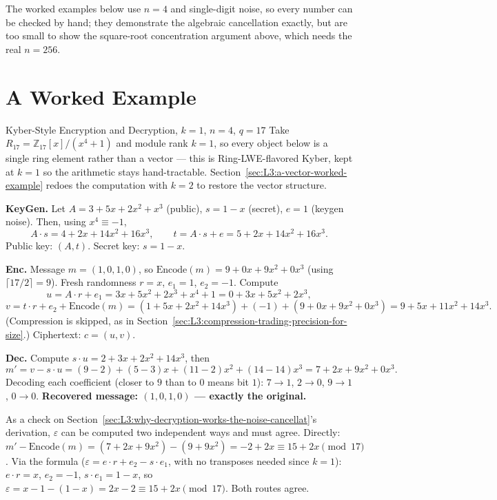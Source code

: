 The worked examples below use $n=4$ and single-digit noise, so every number can be checked by hand; they demonstrate the algebraic cancellation exactly, but are too small to show the square-root concentration argument above, which needs the real $n=256$.

\section{A Worked Example}
\label{sec:L3:a-fully-worked-example-by-hand}

\begin{exbox}{Kyber-Style Encryption and Decryption, $k=1$, $n=4$, $q=17$}
Take $R_{17}=\mathbb{Z}_{17}[x]/(x^4+1)$ and module rank $k=1$, so every object below is a single ring element rather than a vector --- this is Ring-LWE-flavored Kyber, kept at $k=1$ so the arithmetic stays hand-tractable. Section~\ref{sec:L3:a-vector-worked-example} redoes the computation with $k=2$ to restore the vector structure.

\textbf{KeyGen.} Let $A=3+5x+2x^2+x^3$ (public), $s=1-x$ (secret), $e=1$ (keygen noise). Then, using $x^4\equiv-1$,
$$
A\cdot s = 4+2x+14x^2+16x^3, \qquad t = A\cdot s+e = 5+2x+14x^2+16x^3.
$$
Public key: $(A,t)$. Secret key: $s=1-x$.

\textbf{Enc.} Message $m=(1,0,1,0)$, so $\mathrm{Encode}(m)=9+0x+9x^2+0x^3$ (using $\lceil17/2\rceil=9$). Fresh randomness $r=x$, $e_1=1$, $e_2=-1$. Compute
$$
u = A\cdot r+e_1 = 3x+5x^2+2x^3+x^4+1 = 0+3x+5x^2+2x^3,
$$
$$
v = t\cdot r+e_2+\mathrm{Encode}(m) = (1+5x+2x^2+14x^3)+(-1)+(9+0x+9x^2+0x^3) = 9+5x+11x^2+14x^3.
$$
(Compression is skipped, as in Section~\ref{sec:L3:compression-trading-precision-for-size}.) Ciphertext: $c=(u,v)$.

\textbf{Dec.} Compute $s\cdot u = 2+3x+2x^2+14x^3$, then
$$
m' = v-s\cdot u = (9-2)+(5-3)x+(11-2)x^2+(14-14)x^3 = 7+2x+9x^2+0x^3.
$$
Decoding each coefficient (closer to $9$ than to $0$ means bit $1$): $7\to1$, $2\to0$, $9\to1$, $0\to0$. \textbf{Recovered message: $(1,0,1,0)$ --- exactly the original.}

As a check on Section~\ref{sec:L3:why-decryption-works-the-noise-cancellat}'s derivation, $\varepsilon$ can be computed two independent ways and must agree. Directly: $m'-\mathrm{Encode}(m) = (7+2x+9x^2)-(9+9x^2) = -2+2x \equiv 15+2x\pmod{17}$. Via the formula ($\varepsilon=e\cdot r+e_2-s\cdot e_1$, with no transposes needed since $k=1$): $e\cdot r=x$, $e_2=-1$, $s\cdot e_1=1-x$, so $\varepsilon = x-1-(1-x) = 2x-2\equiv15+2x\pmod{17}$. Both routes agree.
\end{exbox}

